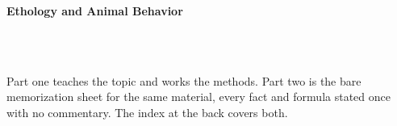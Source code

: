 



\makeindex[title={Index of This Volume},columns=2,intoc]

\begin{titlepage}\thispagestyle{empty}
\vspace*{0.14\textheight}
\noindent{\color{tiercore}\rule{\textwidth}{5pt}}\\[3pt]
\noindent{\color{bioline}\rule{\textwidth}{1pt}}\\[26pt]
\\[12pt]
\noindent\begin{minipage}{\textwidth}\raggedright
{\sffamily\bfseries\fontsize{28}{32}\selectfont\color{bioink}%
 \hyphenchar{} Ethology and Animal Behavior\par}\end{minipage}\\[16pt]
\noindent{\color{biogreen}\rule{\textwidth}{1.4pt}}\\[10pt]
\noindent\begin{minipage}{\textwidth}\raggedright
{\fontsize{10.5}{14}\selectfont\color{biogreen}%
Part one teaches the topic and works the methods. Part two is the bare memorization sheet for the
same material, every fact and formula stated once with no commentary. The index at the back covers both.\par}\end{minipage}
\vfill
\noindent{\color{bioline}\rule{\textwidth}{1pt}}\\[3pt]
\noindent{\color{tiercore}\rule{\textwidth}{5pt}}
\end{titlepage}
\tableofcontents
\clearpage
{}
\clearpage
\printindex

